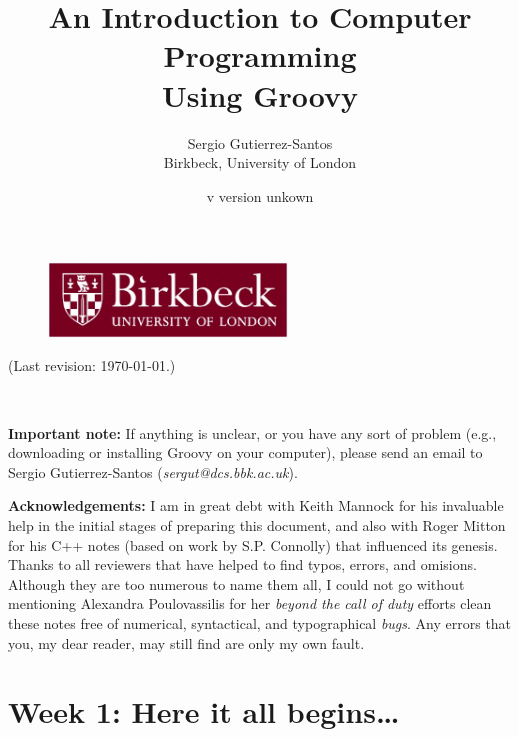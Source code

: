 \documentclass[11pt,a4paper]{article}
\title{An Introduction to Computer Programming\\
  Using Groovy} %
\author{Sergio Gutierrez-Santos\\
  Birkbeck, University of London}
\date{\InputIfFileExists{version.txt}
     {v}
     {version unkown}} %
\begin{document}

\maketitle

\thispagestyle{empty}

\vfill 

\begin{figure}[h!]  %
  \centering
  \includegraphics[height=2cm]{bbk.eps}
\end{figure}

\vfill



\noindent (Last revision: \today.)


\newpage

~\vspace{8cm}

\textbf{Important note: } If anything is unclear, or you have any 
sort of problem (e.g.,
downloading or installing Groovy on your computer), please send an
email to Sergio Gutierrez-Santos (\emph{sergut@dcs.bbk.ac.uk}).

\textbf{Acknowledgements: } I am in great debt with 
Keith Mannock for his invaluable help in the initial stages of
preparing this document, and also with Roger Mitton for his C++ notes
(based on work by S.P. Connolly) that influenced its genesis. 
Thanks to all reviewers that have helped to 
find typos, errors, and omisions. Although they are too numerous to
name them all, I could not go without mentioning Alexandra
Poulovassilis for her \emph{beyond the call of duty} efforts clean
these notes free of numerical, syntactical, and typographical
\emph{bugs}. Any errors that you, my dear reader, may still find are
only my own fault. 

\newpage

\chapter{Week 1: Here it all begins\ldots}
\end{document}
